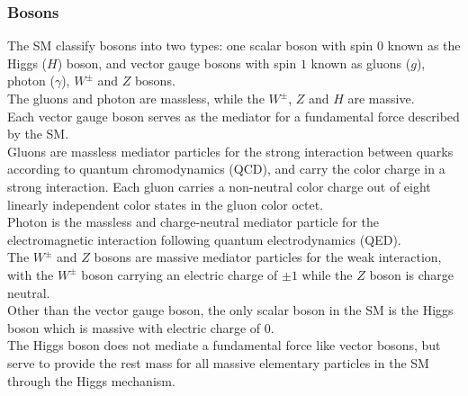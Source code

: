 \documentclass[../thesis.tex]{subfiles}
\begin{document}
\subsubsection*{Bosons}
The \acs{SM} classify bosons into two types: one scalar boson with spin $0$ known as the Higgs ($H$) boson, and vector gauge bosons with spin $1$ known as gluons ($g$), photon ($\gamma$), $W^\pm$ and $Z$ bosons.\\
The gluons and photon are massless, while the $W^\pm$, $Z$ and $H$ are massive.\\
Each vector gauge boson serves as the mediator for a fundamental force described by the SM.\\
Gluons are massless mediator particles for the strong interaction between quarks according to quantum chromodynamics (\acs{QCD}), and carry the color charge in a strong interaction. Each gluon carries a non-neutral color charge out of eight linearly independent color states in the gluon color octet.\\
Photon is the massless and charge-neutral mediator particle for the electromagnetic interaction following quantum electrodynamics (\acs{QED}).\\
The $W^\pm$ and $Z$ bosons are massive mediator particles for the weak interaction, with the $W^\pm$ boson carrying an electric charge of $\pm 1$ while the $Z$ boson is charge neutral.\\
Other than the vector gauge boson, the only scalar boson in the SM is the Higgs boson which is massive with electric charge of $0$.\\
The Higgs boson does not mediate a fundamental force like vector bosons, but serve to provide the rest mass for all massive elementary particles in the SM through the Higgs mechanism.
\end{document}
